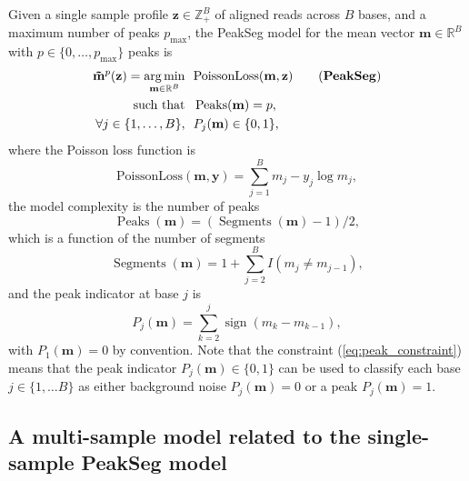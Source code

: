 \documentclass{article} %
\DeclareMathOperator*{\argmin}{arg\,min}
\DeclareMathOperator*{\Peaks}{Peaks}
\DeclareMathOperator*{\Segments}{Segments}
\newcommand{\sign}{\operatorname{sign}}
\newcommand{\RR}{\mathbb R}
\newcommand{\ZZ}{\mathbb Z}
\begin{document}
Given a single sample profile $\mathbf z\in\ZZ_+^B$ of aligned reads
across $B$ bases, and a maximum number of peaks $p_{\text{max}}$, the
PeakSeg model for the mean vector $\mathbf m\in\RR^B$ with $p\in\{0,
\dots, p_{\text{max}}\}$ peaks is
\begin{align}
  \label{PeakSeg}
  \mathbf{\tilde m}^p(\mathbf z)  =
    \argmin_{\mathbf m\in\RR^{B}} &\ \ 
    \text{PoissonLoss}(\mathbf m, \mathbf z) 
    \tag{\textbf{PeakSeg}}
\\
    \text{such that} &\ \  \Peaks(\mathbf m)=p,  \\
     \forall j\in\{1, \dots, B\}, &\ \ P_j(\mathbf m) \in\{0, 1\},
    \label{eq:peak_constraint}
\end{align}
where the Poisson loss function is
\begin{equation}\label{eq:rho}
  \text{PoissonLoss}(\mathbf m, \mathbf y)= \sum_{j=1}^B m_j - y_j \log m_j,
\end{equation} 
the model complexity is the number of peaks
\begin{equation}
  \Peaks(\mathbf m)=(\Segments(\mathbf m)-1)/2,
\end{equation}
which is a function of the number of segments
\begin{equation}
  \Segments(\mathbf m)=1+\sum_{j=2}^B I(m_j \neq m_{j-1}),
\end{equation}
and the peak indicator at base $j$ is
\begin{equation}
  \label{eq:peaks}
  P_j(\mathbf m) = \sum_{k=2}^j \sign( m_{k} - m_{k-1} ),
\end{equation}
with $P_1(\mathbf m)=0$ by convention. Note that the constraint
(\ref{eq:peak_constraint}) means that the peak indicator $P_j(\mathbf
m)\in\{0, 1\}$ can be used to classify each base $j\in\{1,\dots B\}$
as either background noise $P_j(\mathbf m)=0$ or a peak $P_j(\mathbf
m)=1$.

\subsection{A multi-sample model 
  related to the single-sample PeakSeg
  model}
\end{document}
